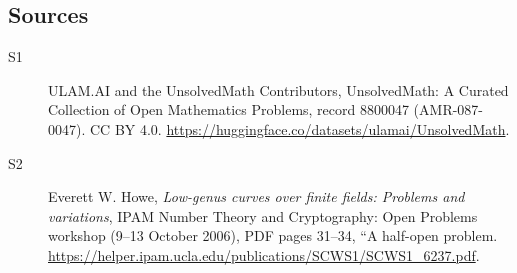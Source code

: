 \documentclass[11pt]{article}
\begin{document}
\subsection{Sources}
\begin{description}
\item[\hypertarget{source:8800047:1}{S1}] ULAM.AI and the UnsolvedMath Contributors, UnsolvedMath: A Curated Collection of Open Mathematics Problems, record 8800047 (AMR-087-0047). CC BY 4.0. \url{https://huggingface.co/datasets/ulamai/UnsolvedMath}.
\item[\hypertarget{source:8800047:2}{S2}] Everett W. Howe, \emph{Low-genus curves over finite fields: Problems and variations}, IPAM Number Theory and Cryptography: Open Problems workshop (9--13 October 2006), PDF pages 31--34, ``A half-open problem. \url{https://helper.ipam.ucla.edu/publications/SCWS1/SCWS1_6237.pdf}.
\end{description}
\label{end:8800047}
\end{document}
